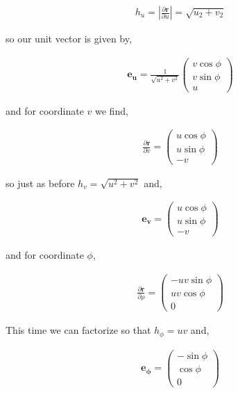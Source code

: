 \documentclass[11pt]{amsart}
\begin{document}
\begin{align*}
  h_u = \left|\frac{\partial\mathbf{r}}{\partial u}\right| = \sqrt{u_2 + v_2}
\end{align*}

so our unit vector is given by,

\begin{align*}
  \mathbf{e_u} = \frac{1}{\sqrt{u^2 + v^2}}
  \begin{pmatrix}
    v\cos\phi \\
    v\sin\phi \\
    u
  \end{pmatrix}
\end{align*}

and for coordinate $v$ we find,

\begin{align*}
  \frac{\partial\mathbf{r}}{\partial v} =
  \begin{pmatrix}
    u\cos\phi \\
    u\sin\phi \\
    -v
  \end{pmatrix}
\end{align*}

so just as before $h_v = \sqrt{u^2 + v^2}$ and,

\begin{align*}
  \mathbf{e_v} =
  \begin{pmatrix}
    u\cos\phi \\
    u\sin\phi \\
    -v
  \end{pmatrix}
\end{align*}

and for coordinate $\phi$,

\begin{align*}
  \frac{\partial\mathbf{r}}{\partial\rho} =
  \begin{pmatrix}
    -uv\sin\phi \\
    uv\cos\phi \\
    0
  \end{pmatrix}
\end{align*}

This time we can factorize so that $h_{\phi} = uv$ and,

\begin{align*}
  \mathbf{e_{\phi}} =
  \begin{pmatrix}
    -\sin\phi \\
    \cos\phi \\
    0
  \end{pmatrix}
\end{align*}
\end{document}
